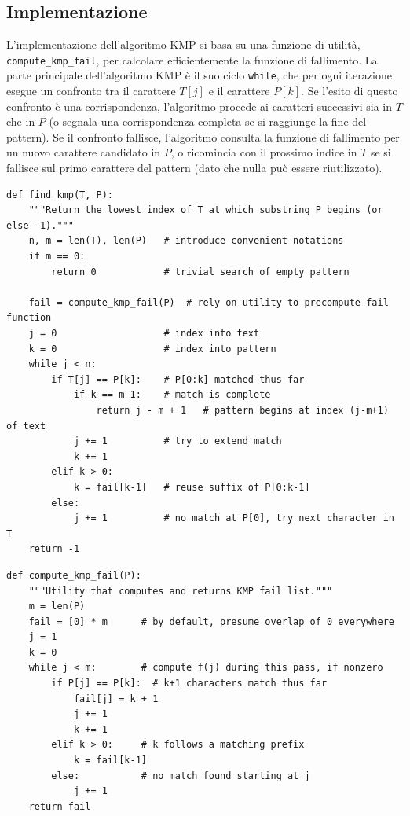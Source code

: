\subsection*{Implementazione}
L'implementazione dell'algoritmo KMP si basa su una funzione di utilità, \texttt{compute\_kmp\_fail}, per calcolare efficientemente la funzione di fallimento. La parte principale dell'algoritmo KMP è il suo ciclo \texttt{while}, che per ogni iterazione esegue un confronto tra il carattere $T[j]$ e il carattere $P[k]$. Se l'esito di questo confronto è una corrispondenza, l'algoritmo procede ai caratteri successivi sia in $T$ che in $P$ (o segnala una corrispondenza completa se si raggiunge la fine del pattern). Se il confronto fallisce, l'algoritmo consulta la funzione di fallimento per un nuovo carattere candidato in $P$, o ricomincia con il prossimo indice in $T$ se si fallisce sul primo carattere del pattern (dato che nulla può essere riutilizzato).

\vspace{1\baselineskip}
\begin{lstlisting}
def find_kmp(T, P):
    """Return the lowest index of T at which substring P begins (or else -1)."""
    n, m = len(T), len(P)   # introduce convenient notations
    if m == 0:
        return 0            # trivial search of empty pattern
    
    fail = compute_kmp_fail(P)  # rely on utility to precompute fail function
    j = 0                   # index into text
    k = 0                   # index into pattern
    while j < n:
        if T[j] == P[k]:    # P[0:k] matched thus far
            if k == m-1:    # match is complete  
                return j - m + 1   # pattern begins at index (j-m+1) of text 
            j += 1          # try to extend match
            k += 1
        elif k > 0:
            k = fail[k-1]   # reuse suffix of P[0:k-1]
        else:
            j += 1          # no match at P[0], try next character in T
    return -1 
\end{lstlisting}


\clearpage
\begin{lstlisting}
def compute_kmp_fail(P):
    """Utility that computes and returns KMP fail list."""
    m = len(P)
    fail = [0] * m      # by default, presume overlap of 0 everywhere
    j = 1
    k = 0
    while j < m:        # compute f(j) during this pass, if nonzero
        if P[j] == P[k]:  # k+1 characters match thus far
            fail[j] = k + 1
            j += 1
            k += 1
        elif k > 0:     # k follows a matching prefix
            k = fail[k-1]
        else:           # no match found starting at j
            j += 1
    return fail
\end{lstlisting}
\vspace{1\baselineskip}

